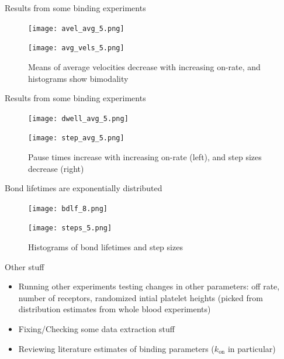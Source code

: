 \documentclass[10pt]{beamer}
\begin{document}
\begin{frame}{Results from some binding experiments}

  \begin{figure}
    \centering
    \parbox{0.49\textwidth}{
      \texttt{[image: avel\_avg\_5.png]}
    }
    \hfill
    \parbox{0.49\textwidth}{
      \texttt{[image: avg\_vels\_5.png]}
    }
    \caption{Means of average velocities decrease with increasing
      on-rate, and histograms show bimodality}
    \label{fig:plot1}
  \end{figure}
\end{frame}

\begin{frame}{Results from some binding experiments}

  \begin{figure}
    \centering
    \parbox{0.49\textwidth}{
      \texttt{[image: dwell\_avg\_5.png]}
    }
    \hfill
    \parbox{0.49\textwidth}{
      \texttt{[image: step\_avg\_5.png]}
    }

    \caption{Pause times increase with increasing on-rate (left), and step
      sizes decrease (right)}
    \label{fig:plot2}
  \end{figure}
\end{frame}

\begin{frame}{Bond lifetimes are exponentially distributed}
  \begin{figure}
    \centering
    \parbox{0.49\textwidth}{
      \texttt{[image: bdlf\_8.png]}
    }
    \hfill
    \parbox{0.49\textwidth}{
      \texttt{[image: steps\_5.png]}
    }
    \caption{Histograms of bond lifetimes and step sizes}
    \label{fig:lifetimes-and-steps}
  \end{figure}
\end{frame}

\begin{frame}{Other stuff}
  \begin{itemize}
  \item Running other experiments testing changes in other parameters:
    off rate, number of receptors, randomized intial platelet heights
    (picked from distribution estimates from whole blood experiments)
  \item Fixing/Checking some data extraction stuff
  \item Reviewing literature estimates of binding parameters
    ($k_\text{on}$ in particular)
  \end{itemize}
\end{frame}
\end{document}
